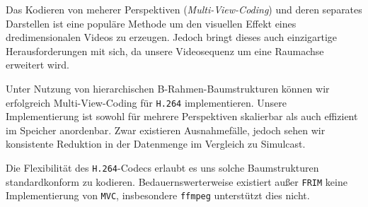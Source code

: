 \noindent\newline Das Kodieren von meherer Perspektiven (\textit{Multi-View-Coding}) und deren separates Darstellen ist
eine popul\"are Methode um den visuellen Effekt eines dredimensionalen Videos zu erzeugen.
Jedoch bringt dieses auch einzigartige Herausforderungen mit sich, da unsere Videosequenz um eine Raumachse erweitert
wird.

\noindent\newline Unter Nutzung von hierarchischen B-Rahmen-Baumstrukturen k\"onnen wir erfolgreich Multi-View-Coding
f\"ur \texttt{H.264} implementieren.
Unsere Implementierung ist sowohl f\"ur mehrere Perspektiven skalierbar als auch effizient im Speicher
anordenbar.
Zwar existieren Ausnahmef\"alle, jedoch sehen wir konsistente Reduktion in der Datenmenge im Vergleich
zu Simulcast.

\noindent\newline Die Flexibilit\"at des \texttt{H.264}-Codecs erlaubt es uns solche Baumstrukturen standardkonform
zu kodieren.
Bedauernswerterweise existiert au{\ss}er \texttt{FRIM}\cite{frim} keine Implementierung von \texttt{MVC}, insbesondere
\texttt{ffmpeg}\cite{ffmpeg} unterst\"utzt dies nicht.





